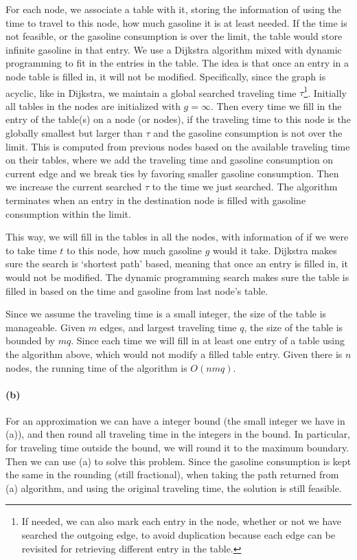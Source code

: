 \documentclass[12pt]{article}
\begin{document}
For each node, we associate a table with it, storing the information of using the time to travel to this node, how much gasoline it is at least needed. If the time is not feasible, or the gasoline consumption is over the limit, the table would store infinite gasoline in that entry. We use a Dijkstra algorithm mixed with dynamic programming to fit in the entries in the table. The idea is that once an entry in a node table is filled in, it will not be modified. Specifically, since the graph is acyclic, like in Dijkstra, we maintain a global searched traveling time $\tau$\footnote{If needed, we can also mark each entry in the node, whether or not we have searched the outgoing edge, to avoid duplication because each edge can be revisited for retrieving different entry in the table.}. Initially all tables in the nodes are initialized with $g=\infty$. Then every time we fill in the entry of the table(s) on a node (or nodes), if the traveling time to this node is the globally smallest but larger than $\tau$ and the gasoline consumption is not over the limit. This is computed from previous nodes based on the available traveling time on their tables, where we add the traveling time and gasoline consumption on current edge and we break ties by favoring smaller gasoline consumption. Then we increase the current searched $\tau$ to the time we just searched. The algorithm terminates when an entry in the destination node is filled with gasoline consumption within the limit. 

This way, we will fill in the tables in all the nodes, with information of if we were to take time $t$ to this node, how much gasoline $g$ would it take. Dijkstra makes sure the search is `shortest path' based, meaning that once an entry is filled in, it would not be modified. The dynamic programming search makes sure the table is filled in based on the time and gasoline from last node's table. 

Since we assume the traveling time is a small integer, the size of the table is manageable. Given $m$ edges, and largest traveling time $q$, the size of the table is bounded by $mq$. Since each time we will fill in at least one entry of a table using the algorithm above, which would not modify a filled table entry. Given there is $n$ nodes, the running time of the algorithm is $O(nmq)$.

\paragraph{(b)} For an approximation we can have a integer bound (the small integer we have in (a)), and then round all traveling time in the integers in the bound. In particular, for traveling time outside the bound, we will round it to the maximum boundary. Then we can use (a) to solve this problem. Since the gasoline consumption is kept the same in the rounding (still fractional), when taking the path returned from (a) algorithm, and using the original traveling time, the solution is still feasible. 
\end{document}
